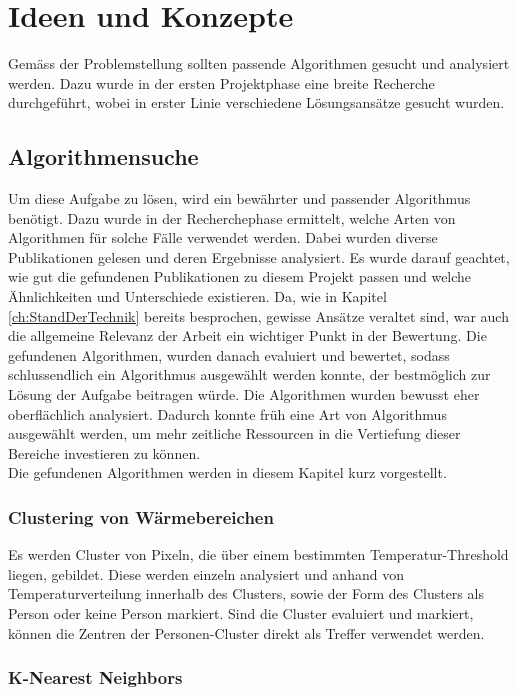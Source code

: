 \chapter{Ideen und Konzepte}
\label{ch:ideasAndConcepts}

Gemäss der Problemstellung sollten passende Algorithmen gesucht und analysiert werden. Dazu wurde in der ersten Projektphase eine breite Recherche durchgeführt, wobei in erster Linie verschiedene Lösungsansätze gesucht wurden.

\section{Algorithmensuche}

Um diese Aufgabe zu lösen, wird ein bewährter und passender Algorithmus benötigt. Dazu wurde in der Recherchephase ermittelt, welche Arten von Algorithmen für solche Fälle verwendet werden. Dabei wurden diverse Publikationen gelesen und deren Ergebnisse analysiert. Es wurde darauf geachtet, wie gut die gefundenen Publikationen zu diesem Projekt passen und welche Ähnlichkeiten und Unterschiede existieren. 
Da, wie in Kapitel \ref{ch:StandDerTechnik} bereits besprochen, gewisse Ansätze veraltet sind, war auch die allgemeine Relevanz der Arbeit ein wichtiger Punkt in der Bewertung. Die gefundenen Algorithmen, wurden danach evaluiert und bewertet, sodass schlussendlich ein Algorithmus ausgewählt werden konnte, der bestmöglich zur Lösung der Aufgabe beitragen würde. Die Algorithmen wurden bewusst eher oberflächlich analysiert.  Dadurch konnte früh eine Art von Algorithmus ausgewählt werden, um mehr zeitliche Ressourcen in die Vertiefung dieser Bereiche investieren zu können.\\
Die gefundenen Algorithmen werden in diesem Kapitel kurz vorgestellt.

\subsection{Clustering von Wärmebereichen}

Es werden Cluster von Pixeln, die über einem bestimmten Temperatur-Threshold liegen, gebildet. Diese werden einzeln analysiert und anhand von Temperaturverteilung innerhalb des Clusters, sowie der Form des Clusters als Person oder keine Person markiert. Sind die Cluster evaluiert und markiert, können die Zentren der Personen-Cluster direkt als Treffer verwendet werden.


\subsection{K-Nearest Neighbors}

